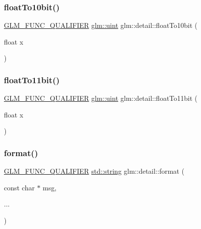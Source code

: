 \mbox{\label{namespaceglm_1_1detail_a2be3138712a0811602a183614221ad5c}} 
\subsubsection{\texorpdfstring{float\+To10bit()}{floatTo10bit()}}
{\footnotesize\ttfamily \mbox{\hyperlink{setup_8hpp_a33fdea6f91c5f834105f7415e2a64407}{G\+L\+M\+\_\+\+F\+U\+N\+C\+\_\+\+Q\+U\+A\+L\+I\+F\+I\+ER}} \mbox{\hyperlink{group__core__precision_ga4fd29415871152bfb5abd588334147c8}{glm\+::uint}} glm\+::detail\+::float\+To10bit (\begin{DoxyParamCaption}\item[{float}]{x }\end{DoxyParamCaption})}

\mbox{\label{namespaceglm_1_1detail_a62edbdbe89fe6282dd7909e6e4703796}} 
\subsubsection{\texorpdfstring{float\+To11bit()}{floatTo11bit()}}
{\footnotesize\ttfamily \mbox{\hyperlink{setup_8hpp_a33fdea6f91c5f834105f7415e2a64407}{G\+L\+M\+\_\+\+F\+U\+N\+C\+\_\+\+Q\+U\+A\+L\+I\+F\+I\+ER}} \mbox{\hyperlink{group__core__precision_ga4fd29415871152bfb5abd588334147c8}{glm\+::uint}} glm\+::detail\+::float\+To11bit (\begin{DoxyParamCaption}\item[{float}]{x }\end{DoxyParamCaption})}

\mbox{\label{namespaceglm_1_1detail_acd5305bbd1c5417b1eb770faf8229d14}} 
\subsubsection{\texorpdfstring{format()}{format()}}
{\footnotesize\ttfamily \mbox{\hyperlink{setup_8hpp_a33fdea6f91c5f834105f7415e2a64407}{G\+L\+M\+\_\+\+F\+U\+N\+C\+\_\+\+Q\+U\+A\+L\+I\+F\+I\+ER}} \mbox{\hyperlink{_s_d_l__opengl__glext_8h_ae84541b4f3d8e1ea24ec0f466a8c568b}{std\+::string}} glm\+::detail\+::format (\begin{DoxyParamCaption}\item[{const char $\ast$}]{msg,  }\item[{}]{... }\end{DoxyParamCaption})}

